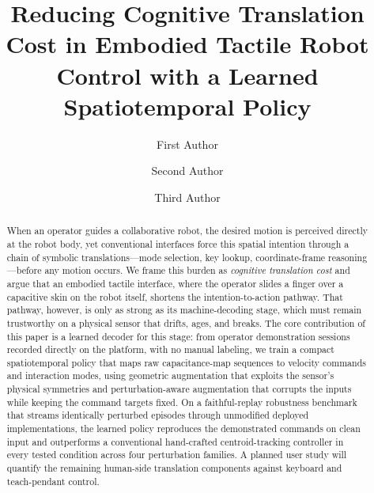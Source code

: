 \documentclass[runningheads]{llncs}
\begin{document}
\title{Reducing Cognitive Translation Cost in Embodied Tactile Robot
Control with a Learned Spatiotemporal Policy}

\author{First Author \and
Second Author \and
Third Author}


\maketitle

\begin{abstract}
When an operator guides a collaborative robot, the desired motion is
perceived directly at the robot body, yet conventional interfaces force
this spatial intention through a chain of symbolic translations---mode
selection, key lookup, coordinate-frame reasoning---before any motion
occurs. We frame this burden as \emph{cognitive translation cost} and
argue that an embodied tactile interface, where the operator slides a
finger over a capacitive skin on the robot itself, shortens the
intention-to-action pathway. That pathway, however, is only as strong as
its machine-decoding stage, which must remain trustworthy on a physical
sensor that drifts, ages, and breaks. The core contribution of this
paper is a learned decoder for this stage: from operator demonstration
sessions recorded directly on the platform, with no manual labeling, we
train a compact spatiotemporal policy that maps raw capacitance-map
sequences to velocity commands and interaction modes, using geometric
augmentation that exploits the sensor's physical symmetries and
perturbation-aware augmentation that corrupts the inputs while keeping
the command targets fixed. On a faithful-replay robustness benchmark
that streams identically perturbed episodes through unmodified deployed
implementations, the learned policy reproduces the demonstrated commands
on clean input and outperforms a conventional hand-crafted
centroid-tracking controller in every tested condition across four
perturbation families. A planned user study will quantify the remaining
human-side translation components against keyboard and teach-pendant
control.

\end{abstract}
\end{document}
